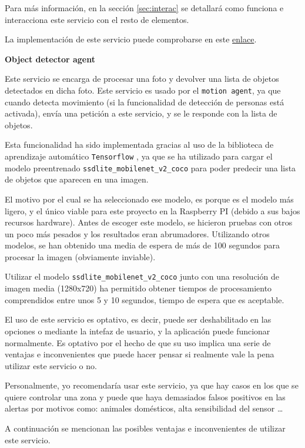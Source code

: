 Para más información, en la sección \ref{sec:interac} se detallará como funciona e interacciona este servicio con el resto de elementos.

La implementación de este servicio puede comprobarse en este \href{https://github.com/jmv74211/TFM_security_system_PI/blob/master/src/agents/motion_agent.py}{enlace}.

\textbf{Object detector agent}

Este servicio se encarga de procesar una foto y devolver una lista de objetos detectados en dicha foto. Este servicio es usado por el \texttt{motion agent}, ya que cuando detecta movimiento (si la funcionalidad de detección de personas está activada), envía una petición a este servicio, y se le responde con la lista de objetos.

Esta funcionalidad ha sido implementada gracias al uso de la biblioteca de aprendizaje automático \texttt{Tensorflow} \cite{ref17}, ya que se ha utilizado para cargar el modelo preentrenado \texttt{ssdlite\_mobilenet\_v2\_coco} \cite{ref27} para poder predecir una lista de objetos que aparecen en una imagen.

El motivo por el cual se ha seleccionado ese modelo, es porque es el modelo más ligero, y el único viable para este proyecto en la Raspberry PI (debido a sus bajos recursos hardware). Antes de escoger este modelo, se hicieron pruebas con otros un poco más pesados y los resultados eran abrumadores. Utilizando otros modelos, se han obtenido una media de espera de más de 100 segundos para procesar la imagen (obviamente inviable).

Utilizar el modelo \texttt{ssdlite\_mobilenet\_v2\_coco} junto con una resolución de imagen media (1280x720) ha permitido obtener tiempos de procesamiento comprendidos entre unos 5 y 10 segundos, tiempo de espera que es aceptable.

El uso de este servicio es optativo, es decir, puede ser deshabilitado en las opciones o mediante la intefaz de usuario, y la aplicación puede funcionar normalmente. Es optativo por el hecho de que su uso implica una serie de ventajas e inconvenientes que puede hacer pensar si realmente vale la pena utilizar este servicio o no.

Personalmente, yo recomendaría usar este servicio, ya que hay casos en los que se quiere controlar una zona y puede que haya demasiados falsos positivos en las alertas por motivos como: animales domésticos, alta sensibilidad del sensor \ldots

A continuación se mencionan las posibles ventajas e inconvenientes de utilizar este servicio.

